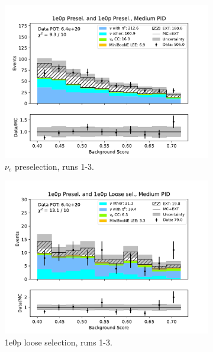 \begin{figure}[H]
    \centering
    \begin{subfigure}{0.5\linewidth}
        \includegraphics[width=\linewidth]{technote/Sidebands/Figures/NearSideband/near_sideband_bkg_score_run123_ZP_ZP_MEDIUM_PID.pdf}
        \caption{$\nu_e$ preselection, runs 1-3.}
    \end{subfigure}%
    \begin{subfigure}{0.5\linewidth}
        \includegraphics[width=\linewidth]{technote/Sidebands/Figures/NearSideband/near_sideband_bkg_score_run123_ZP_ZPLOOSESEL_MEDIUM_PID.pdf}
        \caption{1e0p loose selection, runs 1-3.}
    \end{subfigure}
    \begin{subfigure}{0.5\linewidth}

\end{subfigure}
\end{figure}
